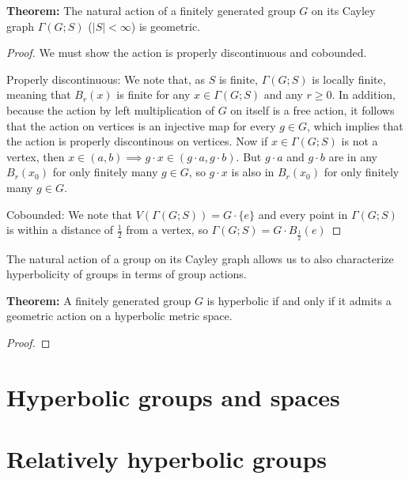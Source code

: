 \documentclass[12pt]{article}
\newcommand{\vs}{\vskip10pt}
\begin{document}
	\vs 
	
	\textbf{Theorem: } The natural action of a finitely generated group $G$ on its Cayley graph $\Gamma(G;S)$ ($\vert S \vert < \infty$) is geometric. 
	
	\begin{proof}
		
		We must show the action is properly discontinuous and cobounded. 
		
		\vs 
		
		Properly discontinuous: We note that, as $S$ is finite, $\Gamma(G;S)$ is locally finite, meaning that $B_r(x)$ is finite for any $x \in \Gamma(G;S)$ and any $r\geq 0$. In addition, because the action by left multiplication of $G$ on itself is a free action, it follows that the action on vertices is an injective map for every $g \in G$, which implies that the action is properly discontinous on vertices. Now if $x \in \Gamma(G;S)$ is not a vertex, then $x \in (a,b) \implies g \cdot x \in (g \cdot a, g \cdot b)$. But $g \cdot a$ and $g \cdot b$ are in any $B_r(x_0)$ for only finitely many $g \in G$, so $g \cdot x$ is also in $B_r(x_0)$ for only finitely many $g \in G$.
		
		\vs 
		
		Cobounded: We note that $V(\Gamma(G;S)) = G \cdot \{e\}$ and every point in $\Gamma(G;S)$ is within a distance of $\frac{1}{2}$ from a vertex, so $\Gamma(G;S) = G \cdot B_{\frac{1}{2}}(e)$
		
	\end{proof}
	
	\vs 
	
	The natural action of a group on its Cayley graph allows us to also characterize hyperbolicity of groups in terms of group actions. 
	
	\vs 
	
	\textbf{Theorem: } A finitely generated group $G$ is hyperbolic if and only if it admits a geometric action on a hyperbolic metric space. 
	
	\begin{proof}
		
		
		
	\end{proof}

	\section{Hyperbolic groups and spaces}
	\section{Relatively hyperbolic groups}
\end{document}
